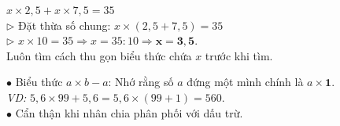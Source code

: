 \documentclass[14pt,a4paper,oneside]{extbook}
\begin{document}
\noindent
\begin{minipage}[t]{0.54\textwidth}
  \begin{tcolorbox}[
    enhanced,
    title={\footnotesize\bfseries\color{white}\faSearch\ Dạng toán tìm $x$ chứa phép tính gộp},
    colback=green!3!white,
    colframe=green!60!black,
    arc=2.5mm, boxrule=0.8pt, top=1.8mm, bottom=1.8mm, left=2.2mm, right=2.2mm
  ]
    \footnotesize
    $x \times 2,5 + x \times 7,5 = 35$\\
    $\triangleright$ Đặt thừa số chung: $x \times (2,5 + 7,5) = 35$\\
    $\triangleright$ $x \times 10 = 35 \Rightarrow x = 35 : 10 \Rightarrow \mathbf{x = 3,5}$.\\
    Luôn tìm cách thu gọn biểu thức chứa $x$ trước khi tìm.
  \end{tcolorbox}
\end{minipage}%
\hfill
\begin{minipage}[t]{0.44\textwidth}
  \begin{tcolorbox}[
    enhanced,
    title={\footnotesize\bfseries\color{white}\faExclamationTriangle\ Mẹo tránh bẫy trắc nghiệm},
    colback=red!2!white,
    colframe=red!70!black,
    arc=2.5mm, boxrule=0.8pt, top=1.8mm, bottom=1.8mm, left=2.2mm, right=2.2mm
  ]
    \footnotesize
    $\bullet$ Biểu thức $a \times b - a$: Nhớ rằng số $a$ đứng một mình chính là $a \times \mathbf{1}$.\\
    \textit{VD:} $5,6 \times 99 + 5,6 = 5,6 \times (99 + 1) = 560$.\\
    $\bullet$ Cẩn thận khi nhân chia phân phối với dấu trừ.
  \end{tcolorbox}
\end{minipage}
\end{document}
